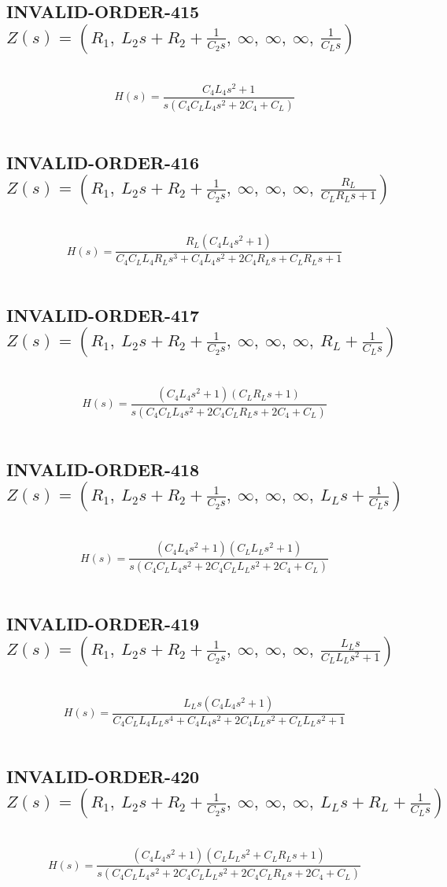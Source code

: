 \documentclass{article}
\begin{document}
\subsection{INVALID-ORDER-415 $Z(s) = \left( R_{1}, \  L_{2} s + R_{2} + \frac{1}{C_{2} s}, \  \infty, \  \infty, \  \infty, \  \frac{1}{C_{L} s}\right)$ } \ 
\textbf{\[H(s) = \frac{C_{4} L_{4} s^{2} + 1}{s \left(C_{4} C_{L} L_{4} s^{2} + 2 C_{4} + C_{L}\right)}\] } \ 
\subsection{INVALID-ORDER-416 $Z(s) = \left( R_{1}, \  L_{2} s + R_{2} + \frac{1}{C_{2} s}, \  \infty, \  \infty, \  \infty, \  \frac{R_{L}}{C_{L} R_{L} s + 1}\right)$ } \ 
\textbf{\[H(s) = \frac{R_{L} \left(C_{4} L_{4} s^{2} + 1\right)}{C_{4} C_{L} L_{4} R_{L} s^{3} + C_{4} L_{4} s^{2} + 2 C_{4} R_{L} s + C_{L} R_{L} s + 1}\] } \ 
\subsection{INVALID-ORDER-417 $Z(s) = \left( R_{1}, \  L_{2} s + R_{2} + \frac{1}{C_{2} s}, \  \infty, \  \infty, \  \infty, \  R_{L} + \frac{1}{C_{L} s}\right)$ } \ 
\textbf{\[H(s) = \frac{\left(C_{4} L_{4} s^{2} + 1\right) \left(C_{L} R_{L} s + 1\right)}{s \left(C_{4} C_{L} L_{4} s^{2} + 2 C_{4} C_{L} R_{L} s + 2 C_{4} + C_{L}\right)}\] } \ 
\subsection{INVALID-ORDER-418 $Z(s) = \left( R_{1}, \  L_{2} s + R_{2} + \frac{1}{C_{2} s}, \  \infty, \  \infty, \  \infty, \  L_{L} s + \frac{1}{C_{L} s}\right)$ } \ 
\textbf{\[H(s) = \frac{\left(C_{4} L_{4} s^{2} + 1\right) \left(C_{L} L_{L} s^{2} + 1\right)}{s \left(C_{4} C_{L} L_{4} s^{2} + 2 C_{4} C_{L} L_{L} s^{2} + 2 C_{4} + C_{L}\right)}\] } \ 
\subsection{INVALID-ORDER-419 $Z(s) = \left( R_{1}, \  L_{2} s + R_{2} + \frac{1}{C_{2} s}, \  \infty, \  \infty, \  \infty, \  \frac{L_{L} s}{C_{L} L_{L} s^{2} + 1}\right)$ } \ 
\textbf{\[H(s) = \frac{L_{L} s \left(C_{4} L_{4} s^{2} + 1\right)}{C_{4} C_{L} L_{4} L_{L} s^{4} + C_{4} L_{4} s^{2} + 2 C_{4} L_{L} s^{2} + C_{L} L_{L} s^{2} + 1}\] } \ 
\subsection{INVALID-ORDER-420 $Z(s) = \left( R_{1}, \  L_{2} s + R_{2} + \frac{1}{C_{2} s}, \  \infty, \  \infty, \  \infty, \  L_{L} s + R_{L} + \frac{1}{C_{L} s}\right)$ } \ 
\textbf{\[H(s) = \frac{\left(C_{4} L_{4} s^{2} + 1\right) \left(C_{L} L_{L} s^{2} + C_{L} R_{L} s + 1\right)}{s \left(C_{4} C_{L} L_{4} s^{2} + 2 C_{4} C_{L} L_{L} s^{2} + 2 C_{4} C_{L} R_{L} s + 2 C_{4} + C_{L}\right)}\] } \ 
\end{document}
